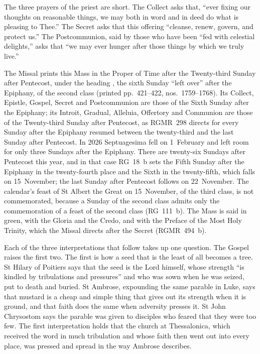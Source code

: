 The three prayers of the priest are short. The Collect asks that, ``ever
fixing our thoughts on reasonable things, we may both in word and in deed do
what is pleasing to Thee.'' The Secret asks that this offering ``cleanse,
renew, govern, and protect us.'' The Postcommunion, said by those who have been
``fed with celestial delights,'' asks that ``we may ever hunger after those
things by which we truly live.''

The Missal prints this Mass in the Proper of Time after the Twenty-third
Sunday after Pentecost, under the heading , the sixth Sunday ``left over'' after the Epiphany, of the
second class (printed pp.~421--422, nos.~1759--1768). Its Collect, Epistle,
Gospel, Secret and Postcommunion are those of the Sixth Sunday after the
Epiphany; its Introit, Gradual, Alleluia, Offertory and Communion are those of
the Twenty-third Sunday after Pentecost, as RGMR~298 directs for every Sunday
after the Epiphany resumed between the twenty-third and the last Sunday after
Pentecost. In 2026 Septuagesima fell on 1~February and left room for only three
Sundays after the Epiphany. There are twenty-six Sundays after Pentecost this
year, and in that case RG~18~b sets the Fifth Sunday after the Epiphany in the
twenty-fourth place and the Sixth in the twenty-fifth, which falls on
15~November; the last Sunday after Pentecost follows on 22~November. The
calendar's feast of St Albert the Great on 15~November, of the third class, is
not commemorated, because a Sunday of the second class admits only the
commemoration of a feast of the second class (RG~111~b). The Mass is said in
green, with the Gloria and the Credo, and with the Preface of the Most Holy
Trinity, which the Missal directs after the Secret (RGMR~494~b).

Each of the three interpretations that follow takes up one question. The
Gospel raises the first two. The first is how a seed that is the least of all
becomes a tree. St Hilary of Poitiers says that the seed is the Lord himself, whose
strength ``is kindled by tribulations and pressures'' and who was sown when he
was seized, put to death and buried. St Ambrose, expounding the same parable in
Luke, says that mustard is a cheap and simple thing that gives out its strength
when it is ground, and that faith does the same when adversity presses it. St
John Chrysostom says the parable was given to disciples who feared that they
were too few. The first interpretation holds that the church at Thessalonica,
which received the word in much tribulation and whose faith then went out into
every place, was pressed and spread in the way Ambrose describes.

